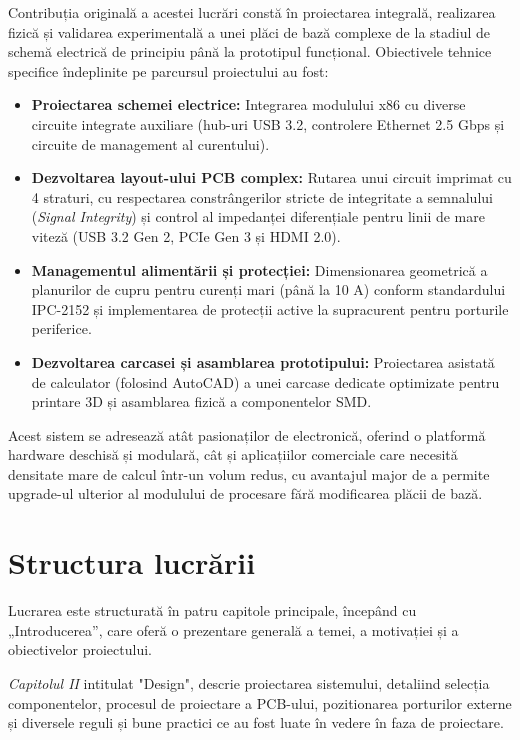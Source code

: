 Contribuția originală a acestei lucrări constă în proiectarea integrală, realizarea fizică și validarea experimentală a unei plăci de bază complexe de la stadiul de schemă electrică de principiu până la prototipul funcțional. Obiectivele tehnice specifice îndeplinite pe parcursul proiectului au fost:

\begin{itemize}
    \item \textbf{Proiectarea schemei electrice:} Integrarea modulului x86 cu diverse circuite integrate auxiliare (hub-uri USB 3.2, controlere Ethernet 2.5 Gbps și circuite de management al curentului).
    \item \textbf{Dezvoltarea layout-ului PCB complex:} Rutarea unui circuit imprimat cu 4 straturi, cu respectarea constrângerilor stricte de integritate a semnalului (\textit{Signal Integrity}) și control al impedanței diferențiale pentru linii de mare viteză (USB 3.2 Gen 2, PCIe Gen 3 și HDMI 2.0).
    \item \textbf{Managementul alimentării și protecției:} Dimensionarea geometrică a planurilor de cupru pentru curenți mari (până la 10 A) conform standardului IPC-2152 și implementarea de protecții active la supracurent pentru porturile periferice.
    \item \textbf{Dezvoltarea carcasei și asamblarea prototipului:} Proiectarea asistată de calculator (folosind AutoCAD) a unei carcase dedicate optimizate pentru printare 3D și asamblarea fizică a componentelor SMD.
\end{itemize}

Acest sistem se adresează atât pasionaților de electronică, oferind o platformă hardware deschisă și modulară, cât și aplicațiilor comerciale care necesită densitate mare de calcul într-un volum redus, cu avantajul major de a permite upgrade-ul ulterior al modulului de procesare fără modificarea plăcii de bază.

\section{Structura lucrării} Lucrarea este structurată în patru capitole principale, începând cu „Introducerea”, care oferă
o prezentare generală a temei, a motivației și a obiectivelor proiectului.

\textit{Capitolul II} intitulat "Design", descrie proiectarea sistemului, detaliind selecția componentelor, procesul de proiectare a \ac{PCB}-ului, pozitionarea porturilor externe și diversele reguli și bune practici ce au fost luate în vedere în faza de proiectare.

